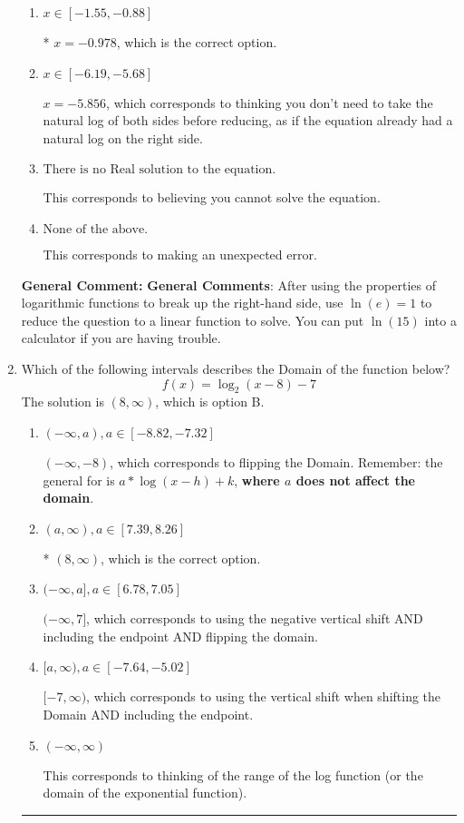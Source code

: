 \documentclass{extbook}[14pt]
\newcommand{\litem}[1]{\item #1

\rule{\textwidth}{0.4pt}}
\begin{document}
\begin{enumerate}
{\begin{enumerate}[label=\Alph*.]
$x = -0.211$, which corresponds to treating any root as a square root.
\item \( x \in [-1.55, -0.88] \)

* $x = -0.978$, which is the correct option.
\item \( x \in [-6.19, -5.68] \)

$x = -5.856$, which corresponds to thinking you don't need to take the natural log of both sides before reducing, as if the equation already had a natural log on the right side.
\item \( \text{There is no Real solution to the equation.} \)

This corresponds to believing you cannot solve the equation.
\item \( \text{None of the above.} \)

This corresponds to making an unexpected error.
\end{enumerate}

\textbf{General Comment:} \textbf{General Comments}: After using the properties of logarithmic functions to break up the right-hand side, use $\ln(e) = 1$ to reduce the question to a linear function to solve. You can put $\ln(15)$ into a calculator if you are having trouble.
}
\litem{
Which of the following intervals describes the Domain of the function below?
\[ f(x) = \log_2{(x-8)}-7 \]
The solution is \( (8, \infty) \), which is option B.\begin{enumerate}[label=\Alph*.]
\item \( (-\infty, a), a \in [-8.82, -7.32] \)

$(-\infty, -8)$, which corresponds to flipping the Domain. Remember: the general for is $a*\log(x-h)+k$, \textbf{where $a$ does not affect the domain}.
\item \( (a, \infty), a \in [7.39, 8.26] \)

* $(8, \infty)$, which is the correct option.
\item \( (-\infty, a], a \in [6.78, 7.05] \)

$(-\infty, 7]$, which corresponds to using the negative vertical shift AND including the endpoint AND flipping the domain.
\item \( [a, \infty), a \in [-7.64, -5.02] \)

$[-7, \infty)$, which corresponds to using the vertical shift when shifting the Domain AND including the endpoint.
\item \( (-\infty, \infty) \)

This corresponds to thinking of the range of the log function (or the domain of the exponential function).
\end{enumerate}

}
\end{enumerate}
\end{document}
